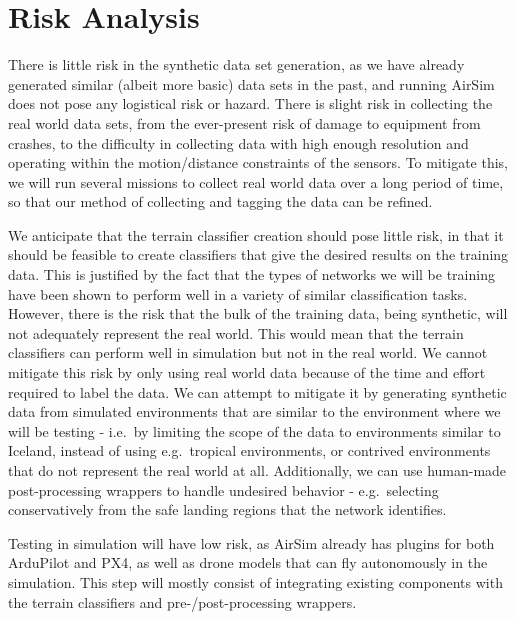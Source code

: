 \section{Risk Analysis}

There is little risk in the synthetic data set generation, as we have already generated similar
(albeit more basic) data sets in the past, and running AirSim does not pose any logistical risk or hazard.
There is slight risk in collecting the real world data sets, from the ever-present risk of damage
to equipment from crashes, to the difficulty in collecting data with high enough resolution and
operating within the motion/distance constraints of the sensors.
To mitigate this, we will run several missions to collect real world data over a long period of time,
so that our method of collecting and tagging the data can be refined.

We anticipate that the terrain classifier creation should pose little risk, in that it should be
feasible to create classifiers that give the desired results on the training data.
This is justified by the fact that the types of networks we will be training have been shown to
perform well in a variety of similar classification tasks.
However, there is the risk that the bulk of the training data, being synthetic, will not adequately
represent the real world.
This would mean that the terrain classifiers can perform well in simulation
but not in the real world.
We cannot mitigate this risk by only using real world data because of the time and effort
required to label the data.
We can attempt to mitigate it by generating synthetic data from simulated environments that are
similar to the environment where we will be testing - i.e.~by limiting the scope of the data
to environments similar to Iceland, instead of using e.g.~tropical environments,
or contrived environments that do not represent the real world at all.
Additionally, we can use human-made post-processing wrappers to handle undesired behavior -
e.g.~selecting conservatively from the safe landing regions that the network identifies.

Testing in simulation will have low risk, as AirSim already has plugins for both ArduPilot and PX4,
as well as drone models that can fly autonomously in the simulation.
This step will mostly consist of integrating existing components with the terrain classifiers and
pre-/post-processing wrappers.

